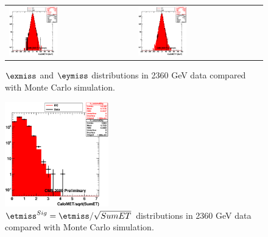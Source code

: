 \begin{figure}[h!]
 \centering
 \begin{tabular}{ll}
  \includegraphics[width=0.40\textwidth]{plots_DataVsMC_MB_2360GeV/h_calometPx.eps} &
  \includegraphics[width=0.40\textwidth]{plots_DataVsMC_MB_2360GeV/h_calometPy.eps} \\
 \end{tabular}
 \caption{$\exmiss$ and $\eymiss$ distributions in 2360 GeV data compared
   with Monte Carlo simulation.
          \label{fig:DataVsMC_MB_2360_2}}
\end{figure}

\begin{figure}[h!]
 \centering
 \includegraphics[width=0.40\textwidth]{plots_DataVsMC_MB_2360GeV/h_calometSig.eps}
\caption{$\etmiss^{Sig}=\etmiss/\sqrt{SumET}$ distributions in 2360 GeV data compared
   with Monte Carlo simulation.
          \label{fig:DataVsMC_MB_2360_3}}
\end{figure}

